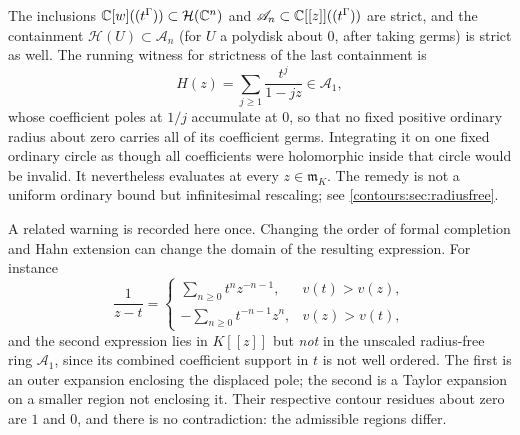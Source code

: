 \documentclass[11pt,letterpaper]{article}
\theoremstyle{definition}
\theoremstyle{remark}
\newcommand{\HH}{\mathcal H}\newcommand{\A}{\mathscr A}\newcommand{\OO}{\mathcal O}
\newcommand{\m}{\mathfrak m}\newcommand{\st}{\operatorname{st}}
\numberwithin{equation}{section}
\begin{document}
The inclusions $\C[w]((t^\Gamma))\subset\HH(\C^n)$ and
$\A_n\subset\C[[z]]((t^\Gamma))$ are strict, and the containment
$\HH(U)\subset\A_n$ (for $U$ a polydisk about $0$, after taking germs) is strict as
well. The running witness for strictness of the last containment is
\begin{equation}\label{contours:eq:shrinking}
  H(z)=\sum_{j\ge1}\frac{t^j}{1-jz}\in\A_1 ,
\end{equation}
whose coefficient poles at $1/j$ accumulate at $0$, so that no fixed positive
ordinary radius about zero carries all of its coefficient germs. Integrating it on
one fixed ordinary circle as though all coefficients were holomorphic inside that
circle would be invalid. It nevertheless evaluates at every $z\in\m_K$. The remedy
is not a uniform ordinary bound but infinitesimal rescaling; see
\cref{contours:sec:radiusfree}.

A related warning is recorded here once. Changing the order of formal completion
and Hahn extension can change the domain of the resulting expression. For instance
\begin{equation}\label{contours:eq:twoexpansions}
 \frac1{z-t}=
 \begin{cases}
 \displaystyle\sum_{n\ge0}t^n z^{-n-1},& v(t)>v(z),\\[0.8em]
 \displaystyle-\sum_{n\ge0}t^{-n-1}z^n,& v(z)>v(t),
 \end{cases}
\end{equation}
and the second expression lies in $K[[z]]$ but \emph{not} in the unscaled
radius-free ring $\A_1$, since its combined coefficient support in $t$ is not well
ordered. The first is an outer expansion enclosing the displaced pole; the second
is a Taylor expansion on a smaller region not enclosing it. Their respective
contour residues about zero are $1$ and $0$, and there is no contradiction: the
admissible regions differ.
\end{document}
